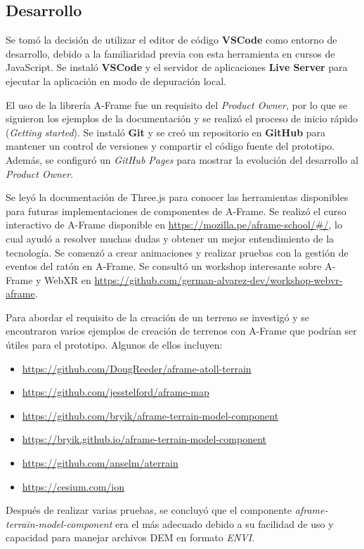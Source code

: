 \documentclass[a4paper, 11pt]{book}
\begin{document}
\subsection{Desarrollo}
Se tomó la decisión de utilizar el editor de código \textbf{VSCode} como entorno de desarrollo, debido a la familiaridad previa con esta herramienta en cursos de JavaScript. 
Se instaló \textbf{VSCode} y el servidor de aplicaciones \textbf{Live Server} para ejecutar la aplicación en modo de depuración local.

El uso de la librería A-Frame fue un requisito del \emph{Product Owner}, por lo que se siguieron los ejemplos de la documentación y se realizó el proceso de inicio rápido (\emph{Getting started}).
Se instaló \textbf{Git} y se creó un repositorio en \textbf{GitHub} para mantener un control de versiones y compartir el código fuente del prototipo. 
Además, se configuró un \emph{GitHub Pages} para mostrar la evolución del desarrollo al \emph{Product Owner}.

Se leyó la documentación de Three.js para conocer las herramientas disponibles para futuras implementaciones de componentes de A-Frame.
Se realizó el curso interactivo de A-Frame disponible en \url{https://mozilla.pe/aframe-school/#/}, lo cual ayudó a resolver muchas dudas y obtener un mejor entendimiento de la tecnología.
Se comenzó a crear animaciones y realizar pruebas con la gestión de eventos del ratón en A-Frame.
Se consultó un workshop interesante sobre A-Frame y WebXR en \url{https://github.com/german-alvarez-dev/workshop-webvr-aframe}.

Para abordar el requisito de la creación de un terreno se investigó y se encontraron varios ejemplos de creación de terrenos con A-Frame que podrían ser útiles para el prototipo. Algunos de ellos incluyen:
\begin{itemize}
    \item \url{https://github.com/DougReeder/aframe-atoll-terrain}
    \item \url{https://github.com/jesstelford/aframe-map}
    \item \url{https://github.com/bryik/aframe-terrain-model-component}
    \item \url{https://bryik.github.io/aframe-terrain-model-component}
    \item \url{https://github.com/anselm/aterrain}
    \item \url{https://cesium.com/ion}
\end{itemize}
Después de realizar varias pruebas, se concluyó que el componente \emph{aframe-terrain-model-component} era el más adecuado debido a su facilidad de uso y capacidad para manejar archivos DEM en formato \emph{ENVI}.
\end{document}
